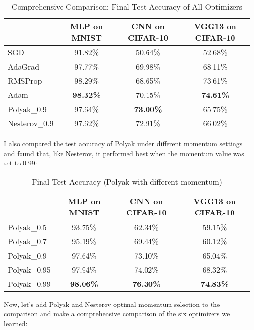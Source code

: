 \documentclass[12pt]{article}
\begin{document}
\begin{table}[H]
\centering
\caption{Comprehensive Comparison: Final Test Accuracy of All Optimizers}
\label{tab:comprehensive_comparison}
\begin{tabular}{|l|c|c|c|}
\hline
             & MLP on MNIST & CNN on CIFAR-10 & VGG13 on CIFAR-10 \\ \hline
SGD          & 91.82\%      & 50.64\%         & 52.68\%           \\ \hline
AdaGrad      & 97.77\%      & 69.98\%         & 68.11\%           \\ \hline
RMSProp      & 98.29\%      & 68.65\%         & 73.61\%           \\ \hline
Adam         & \textbf{98.32\%} & 70.15\%         & \textbf{74.61\%}    \\ \hline
Polyak\_0.9   & 97.64\%      & \textbf{73.00\%}  & 65.75\%           \\ \hline
Nesterov\_0.9 & 97.62\%      & 72.91\%         & 66.02\%           \\ \hline
\end{tabular}
\end{table}

I also compared the test accuracy of Polyak under different momentum settings and found that, like Nesterov, it performed best when the momentum value was set to 0.99:

\begin{table}[H]
\centering
\caption{Final Test Accuracy (Polyak with different momentum)}
\label{tab:polyak_study}
\begin{tabular}{|l|c|c|c|}
\hline
             & MLP on MNIST & CNN on CIFAR-10 & VGG13 on CIFAR-10 \\ \hline
Polyak\_0.5   & 93.75\%      & 62.34\%         & 59.15\%           \\ \hline
Polyak\_0.7   & 95.19\%      & 69.44\%         & 60.12\%           \\ \hline
Polyak\_0.9   & 97.64\%      & 73.10\%         & 65.04\%           \\ \hline
Polyak\_0.95  & 97.94\%      & 74.02\%         & 68.32\%           \\ \hline
Polyak\_0.99  & \textbf{98.06\%} & \textbf{76.30\%}  & \textbf{74.83\%}    \\ \hline
\end{tabular}
\end{table}

Now, let's add Polyak and Nesterov optimal momentum selection to the comparison and make a comprehensive comparison of the six optimizers we learned:
\end{document}
